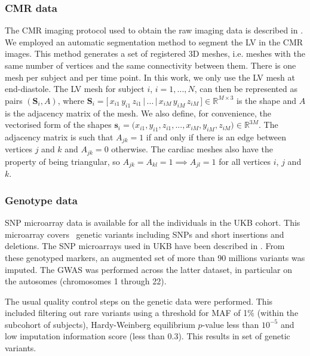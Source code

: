 \subsubsection{CMR data}
The CMR imaging protocol used to obtain the raw imaging data is described in \cite{ref_ukbb_cmr}. 
We employed an automatic segmentation method \cite{ref_rahman} to segment the LV in the CMR images. This method generates a set of registered 3D meshes, i.e. meshes with the same number of vertices and the same connectivity between them. There is one mesh per subject and per time point. In this work, we only use the LV mesh at end-diastole. The LV mesh for subject $i$, $i=1,...,N$, can then be represented as pairs $(\textbf{S}_i, A)$, where $\textbf{S}_i=\big[\,x_{i1}\,y_{i1}\,z_{i1}\,|\,...\,|\,x_{iM}\,y_{iM}\,z_{iM}\,\big]\in \mathbb{R}^{M\times 3}$ is the shape and $A$ is the adjacency matrix of the mesh. We also define, for convenience, the vectorised form of the shapes $\textbf{s}_i=\big(x_{i1},y_{i1},z_{i1},...,x_{iM},y_{iM},z_{iM}\big)\in \mathbb{R}^{3M}$. The adjacency matrix is such that $A_{jk}=1$ if and only if there is an edge between vertices $j$ and $k$ and $A_{jk}=0$ otherwise. The cardiac meshes also have the property of being triangular, so $A_{jk}=A_{kl}=1\implies A_{jl}=1$ for all vertices $i$, $j$ and $k$.

\subsubsection{Genotype data}
SNP microarray data is available for all the individuals in the UKB cohort. This microarray covers \NCALLS\, genetic variants including SNPs and short insertions and deletions. 
The SNP microarrays used in UKB have been described in \cite{ref_ukbb_genetics}. From these genotyped markers, an augmented set of more than 90 millions variants was imputed. The GWAS was performed across the latter dataset, in particular on the autosomes (chromosomes 1 through 22). %

The usual quality control steps on the genetic data were performed. This included filtering out rare variants using a threshold for MAF of 1\% (within the subcohort of \NCMRGBR subjects), Hardy-Weinberg equilibrium $p$-value less than $10^{-5}$ and low imputation information score (less than 0.3). This results in set of \NIMP genetic variants. %

